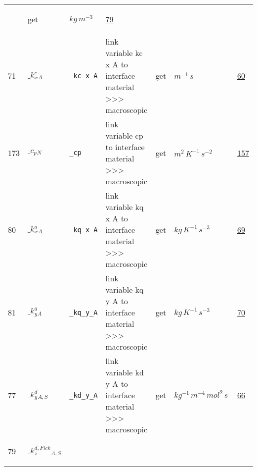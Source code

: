 \begin{longtable}{|p{1cm}|p{2.5cm}|p{4.5cm}|p{8cm}|p{3.0cm}|p{3cm}|p{1cm}|}
             & \begin{lay}get \end{lay}
             & $ kg \,m^{-3} \, $
             &                 \hyperlink{"e:79"}{ 79 }
                 \\
            71
             & \hypertarget{"v:71"}{ $ {{\_k^c_x}}{_{A}} $}
             & \verb|_kc_x_A|
             & link variable kc x A to interface material >>> macroscopic
             & \begin{lay}get \end{lay}
             & $ m^{-1} \,s \, $
             &                 \hyperlink{"e:60"}{ 60 }
                 \\
            173
             & \hypertarget{"v:173"}{ $ {{\_c_p}}{_{N}} $}
             & \verb|_cp|
             & link variable cp to interface material >>> macroscopic
             & \begin{lay}get \end{lay}
             & $ m^{2} \,K^{-1} \,s^{-2} \, $
             &                 \hyperlink{"e:157"}{ 157 }
                 \\
            80
             & \hypertarget{"v:80"}{ $ {{\_k^q_x}}{_{A}} $}
             & \verb|_kq_x_A|
             & link variable kq x A to interface material >>> macroscopic
             & \begin{lay}get \end{lay}
             & $ kg \,K^{-1} \,s^{-3} \, $
             &                 \hyperlink{"e:69"}{ 69 }
                 \\
            81
             & \hypertarget{"v:81"}{ $ {{\_k^q_y}}{_{A}} $}
             & \verb|_kq_y_A|
             & link variable kq y A to interface material >>> macroscopic
             & \begin{lay}get \end{lay}
             & $ kg \,K^{-1} \,s^{-3} \, $
             &                 \hyperlink{"e:70"}{ 70 }
                 \\
            77
             & \hypertarget{"v:77"}{ $ {{\_k^d_y}}{_{A, S}} $}
             & \verb|_kd_y_A|
             & link variable kd y A to interface material >>> macroscopic
             & \begin{lay}get \end{lay}
             & $ kg^{-1} \,m^{-4} \,mol^{2} \,s \, $
             &                 \hyperlink{"e:66"}{ 66 }
                 \\
            79
             & \hypertarget{"v:79"}{ $ {{\_k^{d,Fick}_z}}{_{A, S}} $}

\end{longtable}
